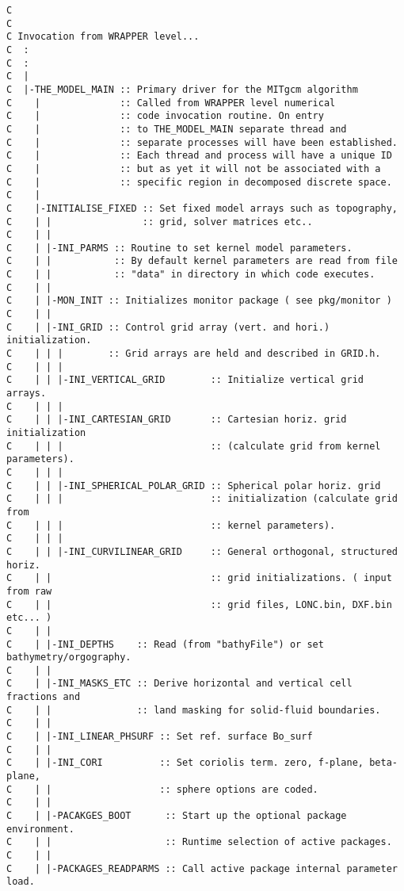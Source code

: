 {\footnotesize
\begin{verbatim}
C
C
C Invocation from WRAPPER level...
C  :
C  :
C  |
C  |-THE_MODEL_MAIN :: Primary driver for the MITgcm algorithm
C    |              :: Called from WRAPPER level numerical
C    |              :: code invocation routine. On entry
C    |              :: to THE_MODEL_MAIN separate thread and
C    |              :: separate processes will have been established.
C    |              :: Each thread and process will have a unique ID
C    |              :: but as yet it will not be associated with a
C    |              :: specific region in decomposed discrete space.
C    |
C    |-INITIALISE_FIXED :: Set fixed model arrays such as topography, 
C    | |                :: grid, solver matrices etc..
C    | |              
C    | |-INI_PARMS :: Routine to set kernel model parameters.
C    | |           :: By default kernel parameters are read from file 
C    | |           :: "data" in directory in which code executes.
C    | |
C    | |-MON_INIT :: Initializes monitor package ( see pkg/monitor )
C    | |
C    | |-INI_GRID :: Control grid array (vert. and hori.) initialization.
C    | | |        :: Grid arrays are held and described in GRID.h.
C    | | |
C    | | |-INI_VERTICAL_GRID        :: Initialize vertical grid arrays.
C    | | |
C    | | |-INI_CARTESIAN_GRID       :: Cartesian horiz. grid initialization
C    | | |                          :: (calculate grid from kernel parameters).
C    | | |
C    | | |-INI_SPHERICAL_POLAR_GRID :: Spherical polar horiz. grid 
C    | | |                          :: initialization (calculate grid from 
C    | | |                          :: kernel parameters).
C    | | |
C    | | |-INI_CURVILINEAR_GRID     :: General orthogonal, structured horiz.
C    | |                            :: grid initializations. ( input from raw
C    | |                            :: grid files, LONC.bin, DXF.bin etc... )
C    | |
C    | |-INI_DEPTHS    :: Read (from "bathyFile") or set bathymetry/orgography.
C    | |
C    | |-INI_MASKS_ETC :: Derive horizontal and vertical cell fractions and
C    | |               :: land masking for solid-fluid boundaries.
C    | |
C    | |-INI_LINEAR_PHSURF :: Set ref. surface Bo_surf
C    | |
C    | |-INI_CORI          :: Set coriolis term. zero, f-plane, beta-plane,
C    | |                   :: sphere options are coded.
C    | |
C    | |-PACAKGES_BOOT      :: Start up the optional package environment.
C    | |                    :: Runtime selection of active packages.
C    | |
C    | |-PACKAGES_READPARMS :: Call active package internal parameter load.

\end{verbatim}}

